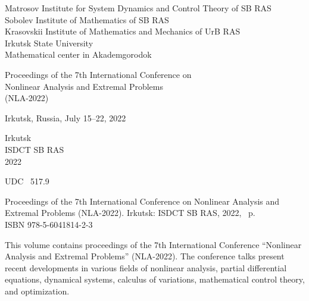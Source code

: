 \documentclass[12pt,final]{llncs}
\begin{document}
%
%
\frontmatter          %
\setcounter{page}{1}
%
%

\begin{center}
{\bf
  \thispagestyle{empty}
  \pagestyle{fancy}

   	Matrosov Institute for System Dynamics and Control Theory of  SB RAS\\[0.3em]

 	Sobolev Institute of Mathematics  of SB RAS\\[0.3em]

  Krasovskii Institute of Mathematics and Mechanics of UrB RAS\\[0.3em]

 	Irkutsk State University\\[0.3em]
 	Mathematical center in Akademgorodok   }


\vfill

{  \Large Proceedings of the 7th International Conference on\\[0.3em]

Nonlinear Analysis and Extremal Problems\\[0.3em]

  (NLA-2022)\\[0.2em] }

{\Large  Irkutsk, Russia, July 15--22, 2022 }

\vfill
\vfill



Irkutsk\\
ISDCT SB RAS\\
2022

\end{center}

\newpage

\thispagestyle{empty}
\noindent{}UDC \ 517.9

 \vspace{3cm}

Proceedings of the 7th International Conference on Nonlinear
Analysis and Extremal Problems  (NLA-2022). Irkutsk\;:
ISDCT SB RAS, 2022, \pageref{LastPage}~p.\\
ISBN 978-5-6041814-2-3

 \vspace{1cm}

This volume contains proceedings of the 7th International Conference ``Nonlinear
Ana\-ly\-sis and Extremal Problems''  (NLA-2022). The conference talks present recent developments in
various fields of nonlinear analysis,  partial differential equations, dynamical systems,
calculus of variations, mathematical control theory, and optimization.
\end{document}

